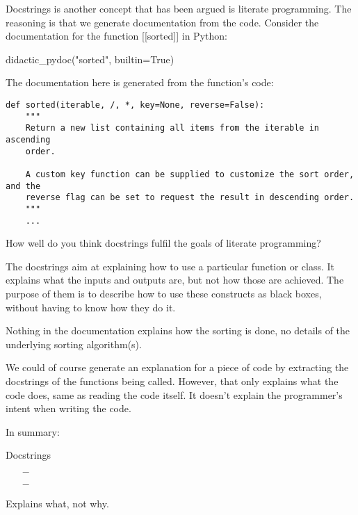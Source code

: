 Docstrings is another concept that has been argued is literate programming.
The reasoning is that we generate documentation from the code.
Consider the documentation for the function [[sorted]]\label{sortedDocExample} 
in Python:
\begin{frame}[fragile]
\begin{pycode}
didactic_pydoc("sorted", builtin=True)
\end{pycode}
\end{frame}
The documentation here is generated from the function's code:
\begin{frame}[fragile]
\begin{verbatim}
def sorted(iterable, /, *, key=None, reverse=False):
    """
    Return a new list containing all items from the iterable in ascending 
    order.

    A custom key function can be supplied to customize the sort order, and the
    reverse flag can be set to request the result in descending order.
    """
    ...
\end{verbatim}
\end{frame}

\begin{frame}
\begin{activity}
How well do you think docstrings fulfil the goals of literate programming?
\end{activity}
\end{frame}

The docstrings aim at explaining how to use a particular function or class.
It explains what the inputs and outputs are, but not how those are achieved.
The purpose of them is to describe how to use these constructs as black boxes, 
without having to know how they do it.

Nothing in the documentation explains how the sorting is done, no details of 
the underlying sorting algorithm(s).

We could of course generate an explanation for a piece of code by extracting 
the docstrings of the functions being called.
However, that only explains what the code does, same as reading the code 
itself.
It doesn't explain the programmer's intent when writing the code.

In summary:

\begin{frame}
\begin{block}{Docstrings}
  \begin{itemize}
    \item[\(-\)] {\color{red}\LPexplain}
    \item[\(-\)] {\color{red}\LPorder}
  \end{itemize}
\end{block}

\begin{remark}
  Explains what, not why.
\end{remark}
\end{frame}


